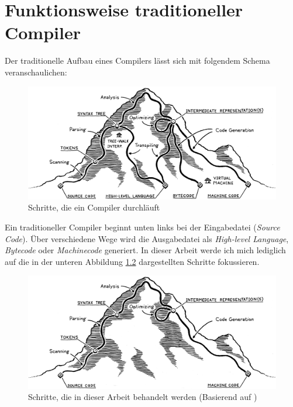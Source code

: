 \chapter{Funktionsweise traditioneller Compiler} \label{cha:3-Tradional_Compiler}

Der traditionelle Aufbau eines Compilers lässt sich mit folgendem Schema veranschaulichen:

\begin{figure}[h!]
    \centering
    \includegraphics[scale=0.2]{resources/images/mountain.png}
    \caption{Schritte, die ein Compiler durchläuft \cite{img:Compiler-steps}}
    \label{fig:mountain}
\end{figure}

Ein traditioneller Compiler beginnt unten links bei der Eingabedatei (\textit{Source Code}). Über verschiedene Wege wird die Ausgabedatei als \textit{High-level Language}, \textit{Bytecode} oder \textit{Machinecode} generiert.
In dieser Arbeit werde ich mich lediglich auf die in der unteren Abbildung \ref{fig:mountain-edited} dargestellten Schritte fokussieren.

\begin{figure}[h!]
    \centering
    \includegraphics[scale=0.2]{resources/images/mountain-edited.png}
    \caption{Schritte, die in dieser Arbeit behandelt werden (Basierend auf \cite{img:Compiler-steps})}
    \label{fig:mountain-edited}
\end{figure}

